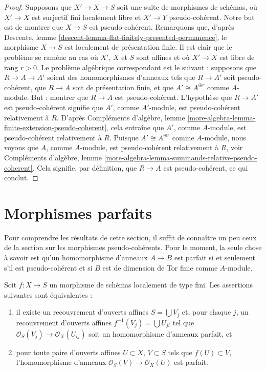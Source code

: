 \begin{proof}
\medskip\noindent
Supposons que $X' \to X \to S$ soit une suite de morphismes de schémas,
où $X' \to X$ est surjectif fini localement libre et $X' \to Y$ pseudo-cohérent.
Notre but est de montrer que $X \to S$ est pseudo-cohérent.
Remarquons que, d'après
Descente, lemme \ref{descent-lemma-flat-finitely-presented-permanence},
le morphisme $X \to S$ est localement de présentation finie.
Il est clair que le problème se ramène au cas où $X'$, $X$ et $S$
sont affines et où $X' \to X$ est libre de rang $r > 0$. Le problème
algébrique correspondant est le suivant : supposons que $R \to A \to A'$ soient des homomorphismes d'anneaux
tels que $R \to A'$ soit pseudo-cohérent, que $R \to A$ soit de présentation finie,
et que $A' \cong A^{\oplus r}$ comme $A$-module. But : montrer que $R \to A$ est
pseudo-cohérent. L'hypothèse que $R \to A'$ est pseudo-cohérent
signifie que $A'$, comme $A'$-module, est pseudo-cohérent relativement à $R$. D'après
Compléments d'algèbre,
lemme \ref{more-algebra-lemma-finite-extension-pseudo-coherent},
cela entraîne que $A'$, comme $A$-module, est pseudo-cohérent relativement à $R$.
Puisque $A' \cong A^{\oplus r}$ comme $A$-module, nous voyons que
$A$, comme $A$-module, est pseudo-cohérent relativement à $R$, voir
Compléments d'algèbre,
lemme \ref{more-algebra-lemma-summands-relative-pseudo-coherent}.
Cela signifie, par définition, que $R \to A$ est pseudo-cohérent, ce qui conclut.
\end{proof}








\section{Morphismes parfaits}
\label{section-perfect}

\noindent
Pour comprendre les résultats de cette
section, il suffit de connaître un peu ceux de la section
sur les morphismes pseudo-cohérents.
Pour le moment, la seule chose à savoir est qu'un homomorphisme d'anneaux
$A \to B$ est parfait si et seulement s'il est pseudo-cohérent
et si $B$ est de dimension de Tor finie comme $A$-module.

\begin{lemma}
\label{lemma-perfect}
Soit $f : X \to S$ un morphisme de schémas localement de type fini.
Les assertions suivantes sont équivalentes :
\begin{enumerate}
\item il existe un recouvrement d'ouverts affines $S = \bigcup V_j$ et, pour chaque $j$,
un recouvrement d'ouverts affines $f^{-1}(V_j) = \bigcup U_{ji}$ tel que
$\mathcal{O}_S(V_j) \to \mathcal{O}_X(U_{ij})$ soit un homomorphisme
d'anneaux parfait, et
\item pour toute paire d'ouverts affines $U \subset X$, $V \subset S$
tels que $f(U) \subset V$, l'homomorphisme d'anneaux
$\mathcal{O}_S(V) \to \mathcal{O}_X(U)$ est parfait.
\end{enumerate}
\end{lemma}

